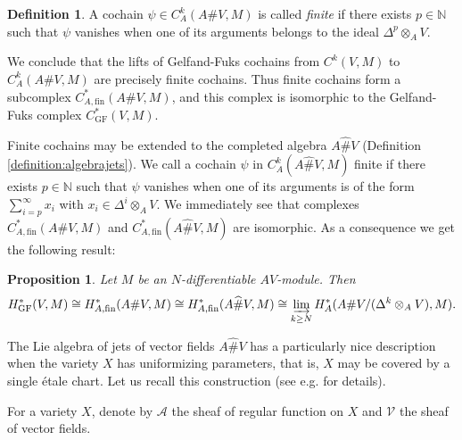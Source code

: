 \documentclass[12pt]{amsart}
\newcommand{\A}{{\mathcal{A}}}
\newcommand{\N}{{\mathbb{N}}}
\newcommand{\V}{{\mathcal{V}}}
\renewcommand{\sp}{{\#}}
\newtheorem{proposition}[theorem]{Proposition}
\theoremstyle{definition}
\newtheorem{definition}{Definition}[section]
\begin{document}
\begin{definition}
A cochain $\psi \in C_A^k (A \sp V, M)$ is called \emph{finite} if there exists $p \in \N$ such that $\psi$ vanishes when one of its arguments belongs to the ideal $\Delta^p \otimes_A V$.
\end{definition}

We conclude that the lifts of Gelfand-Fuks cochains from $C^k(V,M)$ to $C_A^k(A \sp V,M)$ are precisely finite cochains. Thus finite cochains form a subcomplex $C_{A,\text{fin}}^*(A \sp V,M)$, and this complex is isomorphic 
to the Gelfand-Fuks complex $C_\text{GF}^*(V,M)$.

Finite cochains may be extended to the completed algebra $A \widehat{\sp} V$ 
(Definition \ref{definition:algebrajets}).
We call a cochain $\psi$ in $C_A^k (A \widehat{\sp} V, M)$ finite if there exists $p \in \N$ such that $\psi$ vanishes when
one of its arguments is of the form $\sum_{i=p}^\infty x_i$ 
with $x_i \in \Delta^i \otimes_A V$. We immediately see that complexes
$C_{A,\text{fin}}^*(A \sp V,M)$ and $C_{A,\text{fin}}^*(A \widehat{\sp} V,M)$
are isomorphic. As a consequence we get the following result:
\begin{proposition}
\label{isoGF}
Let $M$ be an $N$-differentiable $AV$-module. Then
\[ 
H_\text{GF}^*(V,M) \cong H_{A, \text{fin}}^* (A \sp V, M)
\cong H_{A, \text{fin}}^* (A \widehat{\sp} V, M)
\cong \varinjlim\limits_{k \geq N} H_{A}^* (A \sp V / (\Delta^k \otimes_A V), M).
\]
\end{proposition}


The Lie algebra of jets of vector fields $A \widehat{\sp} V$ has a particularly nice description when the variety $X$ has uniformizing parameters, that is, 
$X$ may be covered by a single \'etale chart. Let us recall this construction
(see e.g. \cite{BilligIngalls} for details).

For a variety $X$, denote by $\A$ the sheaf of regular function on $X$ and $\V$ the sheaf of vector fields. 
\end{document}
